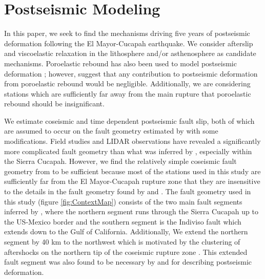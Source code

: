 \documentclass[12pt]{article}
\begin{document}
\section{Postseismic Modeling}\label{sec:Model}

In this paper, we seek to find the mechanisms driving five years of postseismic deformation following the El Mayor-Cucapah earthquake. We consider afterslip and viscoelastic relaxation in the lithosphere and/or asthenosphere as candidate mechanisms.  Poroelastic rebound has also been used to model postseismic deformation \citep[e.g.][]{Jonsson2003}; however, \cite{Gonzalez-ortega2014} suggest that any contribution to postseismic deformation from poroelastic rebound would be negligible.  Additionally, we are considering stations which are sufficiently far away from the main rupture that poroelastic rebound should be insignificant.  

We estimate coseismic and time dependent postseismic fault slip, both of which are assumed to occur on the fault geometry estimated by \citet{Wei2011} with some modifications.  Field studies \citep{Fletcher2014} and LIDAR observations \citep{Oskin2012} have revealed a significantly more complicated fault geometry than what was inferred by \citet{Wei2011}, especially within the Sierra Cucapah.  However, we find the relatively simple coseismic fault geometry from \cite{Wei2011} to be sufficient because most of the stations used in this study are sufficiently far from the El Mayor-Cucapah rupture zone that they are insensitive to the details in the fault geometry found by \cite{Fletcher2014} and \cite{Oskin2012}.  The fault geometry used in this study (figure \ref{fig:ContextMap}) consists of the two main fault segments inferred by \cite{Wei2011}, where the northern segment runs through the Sierra Cucapah up to the US-Mexico border and the southern segment is the Indiviso fault which extends down to the Gulf of California.  Additionally, We extend the northern segment by 40 km to the northwest which is motivated by the clustering of aftershocks on the northern tip of the coseismic rupture zone \citep{Hauksson2011,Kroll2013}.  This extended fault segment was also found to be necessary by \cite{Rollins2015} and \cite{Pollitz2012} for describing postseismic deformation.     
\end{document}
